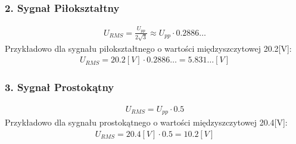 \documentclass[11pt]{article}
\begin{document}
    \subsubsection*{2. Sygnał Piłokształtny}
    \begin{gather*}
        U_{RMS}=\frac{U_{pp}}{2\sqrt{3}}\approx U_{pp}\cdot 0.2886\dots
    \end{gather*}
    Przykładowo dla sygnału piłokształtnego o wartości międzyszczytowej 20.2[V]:
    \begin{gather*}
        U_{RMS}=20.2[V] \cdot 0.2886\dots=5.831\dots[V]
    \end{gather*}

    \subsubsection*{3. Sygnał Prostokątny}
    \begin{gather*}
        U_{RMS}=U_{pp}\cdot 0.5
    \end{gather*}
    Przykładowo dla sygnału prostokątnego o wartości międzyszczytowej 20.4[V]:
    \begin{gather*}
        U_{RMS}=20.4[V] \cdot 0.5=10.2[V]
    \end{gather*}
\end{document}
